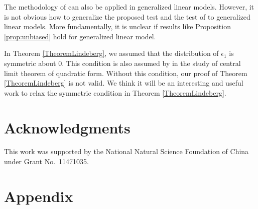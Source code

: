\documentclass[11pt]{article}
\theoremstyle{plain}
\theoremstyle{definition}
\theoremstyle{remark}
\begin{document}
The methodology of \cite{Goeman2006} can also be applied in generalized linear models.
However, it is not obvious how to generalize the proposed test and the test of \cite{Janson2016} to generalized linear models.
More fundamentally, it is unclear if results like Proposition \ref{prop:unbiased} hold for generalized linear model.

In Theorem \ref{TheoremLindeberg}, we assumed that the distribution of $\epsilon_1$ is symmetric about $0$. 
This condition is also assumed by \cite{Bai2017} in the study of central limit theorem of quadratic form.
Without this condition, our proof of Theorem \ref{TheoremLindeberg} is not valid.
We think it will be an interesting and useful work to relax the symmetric condition in Theorem \ref{TheoremLindeberg}.





\section*{Acknowledgments}
This work was supported by the National Natural Science Foundation of China under Grant No.\ 11471035.





\appendix
\section*{Appendix}
\end{document}
